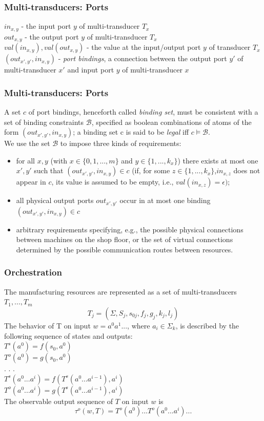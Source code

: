 \documentclass{beamer}
\theoremstyle{definition}
\theoremstyle{plain}
\begin{document}
\begin{frame}
\frametitle{Multi-transducers: Ports}
$ in_{x, y} $ - the input port $y$ of multi-transducer $T_{x}$\\
$ out_{x, y} $ - the output port $y$ of multi-transducer $T_{x}$\\
$ val(in_{x,y}), val(out_{x,y})$ - the value at the input/output port $y$ of transducer $T_{x}$\\
$ (out_{x', y'}, in_{x, y})$ - \textit{port bindings}, a connection between the output port $y'$ of multi-transducer $x'$ and input port $y$ of multi-transducer $x$\\
\end{frame}

\begin{frame}
\frametitle{Multi-transducers: Ports}
A set $c$ of port bindings, henceforth called \textit{binding set}, must be consistent with a set of binding constraints $\mathcal{B}$, specified as boolean combinations of atoms of the form $ (out_{x', y'}, in_{x, y})$; a binding set c is said to be \textit{legal} iff $c \models \mathcal{B}$.\\
We use the set $\mathcal{B}$ to impose three kinds of requirements: \\
\begin{itemize}
\item for all $x, y$ (with $x \in \{0, 1, . . . , m\}$ and $y \in \{1, . . . ,k_{x}\}$) there exists at most one $x', y'$ such that $ (out_{x', y'}, in_{x, y}) \in c$ (if, for some $z \in \{1, . . . , k_{x}\}$,$ in_{x,z}$ does not appear in $c$, its value is assumed to be empty, i.e., $val(in_{x,z}) = \epsilon)$;
\item all physical output ports $out_{x', y'}$ occur in at most one binding $ (out_{x', y'}, in_{x, y}) \in c$
\item arbitrary requirements specifying, e.g., the possible physical connections between machines on the shop floor, or the set of virtual connections determined by the possible communication routes between resources.
\end{itemize}
\end{frame}

\begin{frame}
\frametitle{Orchestration}
The manufacturing resources are represented as a set of multi-transducers $T_{1}, . . . , T_{m}$\\
$$T_{j} = (\Sigma, S_{j}, s_{0j}, f_{j}, g_{j}, k_{j}, l_{j})$$
The behavior of T on input $w = a^{0}a^{1}. . . $, where $a_{i} \in \Sigma_{k}$, is described by the following sequence of states and outputs:\\
$T^{s}(a^{0}) = f(s_{0}, a^{0})$\\
$T^{o}(a^{0}) = g(s_{0}, a^{0})$\\
. . .\\
$T^{s}(a^{0} . . . a^{i}) = f(T^{s}(a^{0} . . . a^{i-1}), a^{i})$\\
$T^{o}(a^{0} . . . a^{i}) = g(T^{s}(a^{0} . . . a^{i-1}), a^{i})$\\
The observable output sequence of $T$ on input $w$ is
$$\tau^{o}(w, T) = T^{o}(a^{0}) . . . T^{o}(a^{0} . . . a^{i}) . . .$$
\end{frame}
\end{document}
